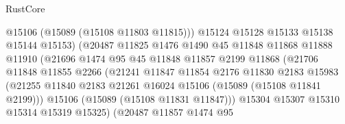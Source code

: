 \begin{lexlean}{RustCore}
\begin{coremodule}
                                      @15106
                                      (@15089 (@15108 @11803 @11815)))
                                    @15124
                                    @15128
                                    @15133
                                    @15138
                                    @15144
                                    @15153)
                                  (@20487
                                    @11825
                                    @1476
                                    @1490
                                    @45
                                    @11848
                                    @11868
                                    @11888
                                    @11910
                                    (@21696
                                      @1474
                                      @95
                                      @45
                                      @11848
                                      @11857
                                      @2199
                                      @11868
                                      (@21706
                                        @11848
                                        @11855
                                        @2266
                                        (@21241
                                          @11847
                                          @11854
                                          @2176
                                          @11830
                                          @2183
                                          @15983
                                          (@21255
                                            @11840
                                            @2183
                                            @21261
                                            @16024
                                            @15106
                                            (@15089 (@15108 @11841 @2199)))
                                          @15106
                                          (@15089 (@15108 @11831 @11847)))
                                        @15304
                                        @15307
                                        @15310
                                        @15314
                                        @15319
                                        @15325)
                                      (@20487
                                        @11857
                                        @1474
                                        @95

\end{coremodule}
\end{lexlean}
